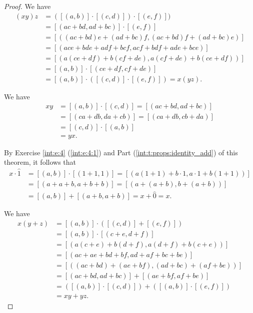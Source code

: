 \begin{proof}
	We have
	\begin{align*}
		(xy)z & = ([(a, b)] \cdot [(c, d)]) \cdot [(e, f)])            \\
		      & = [(ac + bd, ad + bc)] \cdot [(e, f)]                  \\
		      & = [((ac + bd)e + (ad + bc)f, (ac + bd)f + (ad + bc)e)] \\
		      & = [(ace + bde + adf + bcf, acf + bdf + ade + bce)]     \\
		      & = [(a(ce + df) + b(cf + de), a(cf + de) + b(ce + df))] \\
		      & = [(a, b)] \cdot [(ce + df, cf + de)]                  \\
		      & = [(a, b)] \cdot ([(c, d)] \cdot [(e, f)]) = x(yz).
	\end{align*}

	We have
	\begin{align*}
		xy & = [(a, b)] \cdot [(c, d)] = [(ac + bd, ad + bc)] \\
		   & = [(ca + db, da + cb)] = [(ca + db, cb + da)]    \\
		   & = [(c, d)] \cdot [(a, b)]                        \\
		   & = yx.
	\end{align*}

	By Exercise \ref{int:e:4} (\ref{int:e:4:1}) and Part (\ref{int:t:props:identity_add}) of this theorem, it follows that
	\begin{align*}
		x \cdot \hat{1} & = [(a, b)] \cdot [(1 + 1, 1)] = [(a(1 + 1) + b \cdot 1, a \cdot 1 + b(1 + 1))] \\
		                & = [(a + a + b, a + b + b)] = [(a + (a + b), b + (a + b))]                      \\
		                & = [(a, b)] + [(a + b, a + b)] = x + \hat{0} = x.
	\end{align*}

	We have
	\begin{align*}
		x(y + z) & = [(a, b)] \cdot ([(c, d)] + [(e, f)])                  \\
		         & = [(a, b)] \cdot [(c + e, d + f)]                       \\
		         & = [(a(c + e) + b(d + f), a(d + f) + b(c + e))]          \\
		         & = [(ac + ae + bd + bf, ad + af + bc + be)]              \\
		         & = [((ac + bd) + (ae + bf), (ad + bc) + (af + be))]      \\
		         & = [(ac + bd, ad + bc)] + [(ae + bf, af + be)]           \\
		         & = ([(a, b)] \cdot [(c, d)]) + ([(a, b)] \cdot [(e, f)]) \\
		         & = xy + yz.
	\end{align*}


\end{proof}
